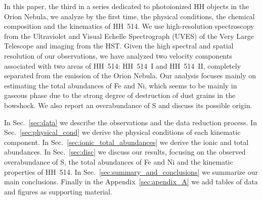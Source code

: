 \documentclass[fleqn,usenatbib]{mnras}
\begin{document}
In this paper, the third in a series dedicated to photoionized HH objects in the Orion Nebula, we analyze by the first time, the physical conditions, the chemical composition and the kinematics of HH~514. We use high-resolution spectroscopy from the Ultraviolet and Visual Echelle Spectrograph (UVES) \citep[][]{Dodorico00} of the Very Large Telescope and imaging from the HST. Given the high spectral and spatial resolution of our observations, we have analyzed two velocity components associated with two areas of HH~514: HH~514~I and HH~514~II, completely separated from the emission of the Orion Nebula. Our analysis focuses mainly on estimating the total abundances of Fe and Ni, which seems to be mainly in gaseous phase due to the strong degree of destruction of dust grains in the bowshock. We also report an overabundance of S and discuss its possible origin.

In Sec.~\ref{sec:data} we describe the observations and the data reduction process. In Sec.~\ref{sec:physical_cond} we derive the physical conditions of each kinematic component. In Sec.~\ref{sec:ionic_total_abundances} we derive the ionic and total abundances. In Sec.~\ref{sec:disc} we discuss our results, focusing on the observed overabundance of S, the total abundances of Fe and Ni and the kinematic properties of HH~514. In Sec.~\ref{sec:summary_and_conclusions} we summarize our main conclusions. Finally in the Appendix~\ref{sec:apendix_A} we add tables of data
and figures as supporting material.
\end{document}
